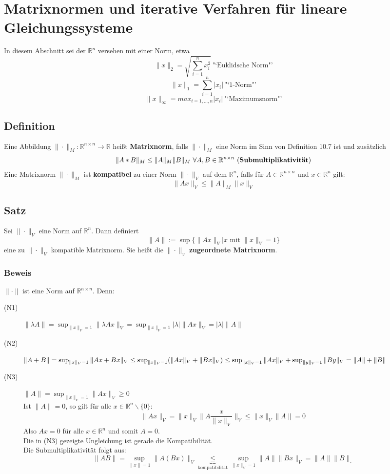 \documentclass{scrbook}
\begin{document}
\chapter{Matrixnormen und iterative Verfahren für lineare Gleichungssysteme}
In diesem Abschnitt sei der $\mathbb{R}^n$ versehen mit einer Norm, etwa
\[\|x\|_2 = \sqrt{\sum^n_{i=1}x_i^2}\ \text{"`Euklidsche Norm"'}\]
\[\|x\|_1= \sum^n_{i=1} |x_i| \ \text{"`1-Norm"'} \]
\[\|x\|_\infty= max_{i=1,...,n} |x_i| \ \text{"`Maximumsnorm"'} \]
\section{Definition}
Eine Abbildung $\|\cdot\|_M: \mathbb{R}^{n \times n}\to\mathbb{R}$ heißt \textbf{Matrixnorm}, falls $\|\cdot\|_M$ eine Norm im Sinn von Definition 10.7 ist und zusätzlich
\[
\|A*B\|_M \leq \|A\|_M\|B\|_M \ \forall A,B \in \mathbb{R}^{n\times n} \ \text{(\textbf{Submultiplikativität})}
\]
Eine Matrixnorm $\|\cdot\|_M$ ist \textbf{kompatibel} zu einer Norm $\|\cdot\|_V$ auf dem $\mathbb{R}^n$, falls für $A \in \mathbb{R}^{n \times n}$ und $x \in \mathbb{R}^n$ gilt:
\[
\|Ax\|_V \leq \|A\|_M \|x\|_V
\]
\section{Satz}
Sei $\| \cdot \| _V$ eine Norm auf $\mathbb{R}^n$. Dann definiert
\[
\|A\| := \sup\{
\|Ax\|_V|x \text{ mit } \|x\|_V = 1
\}
\]
eine zu $\| \cdot \|_V$ kompatible Matrixnorm. Sie heißt die $\|\cdot\|_v$ \textbf{zugeordnete Matrixnorm}.
\subsection*{Beweis}
$\| \cdot \|$ ist eine Norm auf $\mathbb{R}^{n \times n}$. Denn:
\begin{description}
\item[(N1)] $\| \lambda A\| = \sup_{\|x\|_V =1} \|\lambda A x\|_V = \sup_{\|x\|_V =1} |\lambda| \|Ax\|_V = |\lambda| \|A\|$
\item[(N2)] $\|A+B\| = \sup_{\|x\|_V =1} \|Ax+Bx\|_V \leq \sup_{\|x\|_V =1}(\|Ax\|_V+\|Bx\|_V)\\ \leq \sup_{\|x\|_V =1} \|Ax\|_V + \sup_{\|y\|_V =1} \|By\|_V = \|A\|+\|B\|$
\item[(N3)]$\|A\| = \sup_{\|x\|_V =1} \|Ax\|_V \geq 0$\\
Ist $\|A\| = 0$, so gilt für alle $x \in \mathbb{R}^n\backslash \{0\}$:
\[\|Ax\|_V = \|x\|_V \|A \frac{x}{\|x\|_V}\|_V \leq \|x\|_V \|A\| = 0\]
Also $Ax=0$ für alle $x \in \mathbb{R}^n$ und somit $A=0$.\\Die in (N3) gezeigte Ungleichung ist gerade die Kompatibilität.\\
Die Submultiplikativität folgt aus:
\[\|AB\| = \sup_{\|x\|=1}\|A(Bx)\|_V 
\underbrace{\leq}_{\text{kompatibilität}}
\sup_{\|x\|_V =1} \|A\|\|Bx\|_V = \|A\|\|B\|
_\square \]
\end{description}
\end{document}
